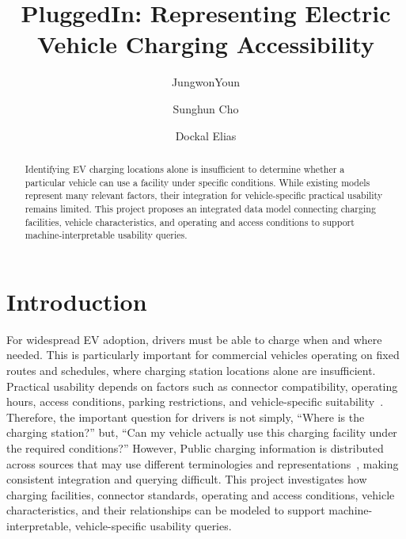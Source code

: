 \documentclass[sigconf]{acmart}
\begin{document}
\title{PluggedIn: Representing Electric Vehicle Charging Accessibility}
\author{JungwonYoun}
\author{Sunghun Cho}
\author{Dockal Elias}

\begin{abstract}
Identifying EV charging locations alone is insufficient to determine whether a particular vehicle can use a facility under specific conditions. While existing models represent many relevant factors, their integration for vehicle-specific practical usability remains limited. This project proposes an integrated data model connecting charging facilities, vehicle characteristics, and operating and access conditions to support machine-interpretable usability queries.
\end{abstract}


\maketitle
\section{Introduction}
For widespread EV adoption, drivers must be able to charge when and where needed. This is particularly important for commercial vehicles operating on fixed routes and schedules, where charging station locations alone are insufficient. Practical usability depends on factors such as connector compatibility, operating hours, access conditions, parking restrictions, and vehicle-specific suitability~\cite{evkg}. Therefore, the important question for drivers is not simply, ``Where is the charging station?'' but, ``Can my vehicle actually use this charging facility under the required conditions?'' However, Public charging information is distributed across sources that may use different terminologies and representations~\cite{Liu_2025}, making consistent integration and querying difficult. This project investigates how charging facilities, connector standards, operating and access conditions, vehicle characteristics, and their relationships can be modeled to support machine-interpretable, vehicle-specific usability queries.
\end{document}
